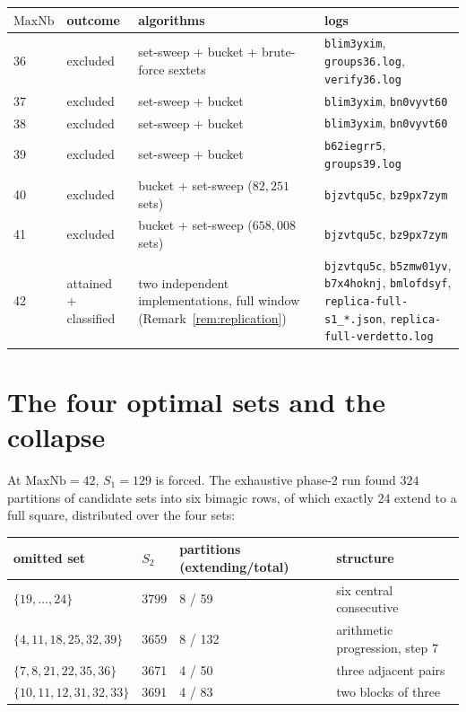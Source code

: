 \documentclass[11pt]{article}
\begin{document}
\begin{center}
\small
\begin{tabular}{@{}l>{\raggedright\arraybackslash}p{2.5cm}>{\raggedright\arraybackslash}p{4.1cm}>{\raggedright\arraybackslash}p{4.9cm}@{}}
\toprule
$\mathrm{MaxNb}$ & outcome & algorithms & logs\\
\midrule
36 & excluded & set-sweep + bucket + brute-force sextets & \texttt{blim3yxim}, \texttt{groups36.log}, \texttt{verify36.log}\\
37 & excluded & set-sweep + bucket & \texttt{blim3yxim}, \texttt{bn0vyvt60}\\
38 & excluded & set-sweep + bucket & \texttt{blim3yxim}, \texttt{bn0vyvt60}\\
39 & excluded & set-sweep + bucket & \texttt{b62iegrr5}, \texttt{groups39.log}\\
40 & excluded & bucket + set-sweep ($82{,}251$ sets) & \texttt{bjzvtqu5c}, \texttt{bz9px7zym}\\
41 & excluded & bucket + set-sweep ($658{,}008$ sets) & \texttt{bjzvtqu5c}, \texttt{bz9px7zym}\\
42 & attained + classified & two independent implementations, full window (Remark~\ref{rem:replication}) & \texttt{bjzvtqu5c}, \texttt{b5zmw01yv}, \texttt{b7x4hoknj}, \texttt{bmlofdsyf}, \texttt{replica-full-s1\_*.json}, \texttt{replica-full-verdetto.log}\\
\bottomrule
\end{tabular}
\end{center}

\section{The four optimal sets and the collapse}\label{sec:collapse}

At $\mathrm{MaxNb}=42$, $S_1=129$ is forced. The exhaustive phase-2 run
found $324$ partitions of candidate sets into six bimagic rows, of which
exactly $24$ extend to a full square, distributed over the four sets:

\begin{center}
\begin{tabular}{llll}
\toprule
omitted set & $S_2$ & partitions (extending/total) & structure\\
\midrule
$\{19,\dots,24\}$        & 3799 & 8 / 59  & six central consecutive\\
$\{4,11,18,25,32,39\}$   & 3659 & 8 / 132 & arithmetic progression, step 7\\
$\{7,8,21,22,35,36\}$    & 3671 & 4 / 50  & three adjacent pairs\\
$\{10,11,12,31,32,33\}$  & 3691 & 4 / 83  & two blocks of three\\
\bottomrule
\end{tabular}
\end{center}
\end{document}
